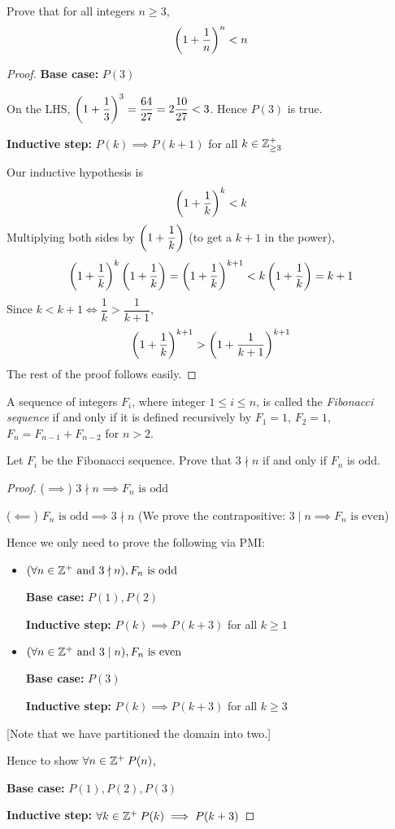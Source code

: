 \begin{prbm}
Prove that for all integers $n \ge 3$, 
\[ \left(1+\frac{1}{n}\right)^n<n \]
\end{prbm}

\begin{proof}
\textbf{Base case:} $P(3)$

On the LHS, $\left(1+\dfrac{1}{3}\right)^3=\dfrac{64}{27}=2\dfrac{10}{27}<3$. Hence $P(3)$ is true.

\textbf{Inductive step:} $P(k)\implies P(k+1)$ for all $k\in\mathbb Z^+_{\ge3}$

Our inductive hypothesis is
\[ \left(1+\frac{1}{k}\right)^k<k \]
Multiplying both sides by $\left(1+\dfrac{1}{k}\right)$ (to get a $k+1$ in the power),
\[ \left(1+\frac{1}{k}\right)^k\left(1+\frac{1}{k}\right)=\left(1+\frac{1}{k}\right)^{k+1}<k\left(1+\frac{1}{k}\right)=k+1  \]
Since $k<k+1 \iff \dfrac{1}{k}>\dfrac{1}{k+1}$, 
\[ \left(1+\frac{1}{k}\right)^{k+1} > \left(1+\frac{1}{k+1}\right)^{k+1} \]
The rest of the proof follows easily.
\end{proof}

A sequence of integers $F_i$, where integer $1\le i\le n$, is called the \emph{Fibonacci sequence} if and only if it is defined recursively by $F_1=1$, $F_2=1$, $F_n=F_{n-1}+F_{n-2}$ for $n>2$.

\begin{prbm}
Let $F_i$ be the Fibonacci sequence. Prove that $3\nmid n$ if and only if $F_n$ is odd.
\end{prbm}

\begin{proof}
($\implies$) $3\nmid n \implies F_n \text{ is odd}$

($\impliedby$) $F_n \text{ is odd} \implies 3\nmid n$ (We prove the contrapositive: $3\mid n \implies F_n \text{ is even}$)

Hence we only need to prove the following via PMI:
\begin{itemize}
\item $(\forall n\in\mathbb Z^+\text{ and }3\nmid n), F_n\text{ is odd}$

\textbf{Base case:} $P(1),P(2)$

\textbf{Inductive step:} $P(k)\implies P(k+3)$ for all $k\ge1$

\item $(\forall n\in\mathbb Z^+\text{ and }3\mid n), F_n\text{ is even}$

\textbf{Base case:} $P(3)$

\textbf{Inductive step:} $P(k)\implies P(k+3)$ for all $k\ge3$
\end{itemize}
[Note that we have partitioned the domain into two.]

Hence to show $\forall n\in\mathbb Z^+\:P(n)$,

\textbf{Base case:} $P(1),P(2),P(3)$

\textbf{Inductive step:} $\forall k\in\mathbb Z^+\:P(k)\implies P(k+3)$
\end{proof}
\pagebreak

